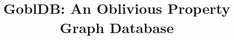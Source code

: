 \documentclass[sigconf]{acmart}
\newcommand{\system}{GoblDB\xspace}
\begin{document}
\title{\system: An Oblivious Property Graph Database}



\maketitle





%
% 

%



\end{document}
